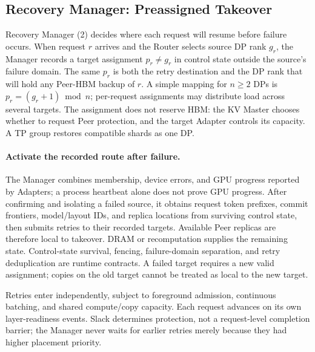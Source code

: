 \subsection{Recovery Manager: Preassigned Takeover}
\label{sec:parallel-recovery}
\label{sec:recovery-manager}

Recovery Manager (2) decides where each request will resume before
failure occurs. When request $r$ arrives and the Router selects source
DP rank $g_r$, the Manager records a target assignment $p_r\ne g_r$
in control state outside the source's failure domain. The same $p_r$
is both the retry destination and the DP rank that will hold any
Peer-HBM backup of $r$. A simple mapping for $n\ge2$ DPs is
$p_r=(g_r+1)\bmod n$; per-request assignments may distribute load across
several targets. The assignment does not reserve HBM: the KV Master
chooses whether to request Peer protection, and the target Adapter
controls its capacity. A TP group restores compatible shards as one DP.

\paragraph{Activate the recorded route after failure.}
The Manager combines membership, device errors, and GPU progress
reported by Adapters; a process heartbeat alone does not prove GPU
progress. After confirming and isolating a failed source, it obtains
request token prefixes, commit frontiers, model/layout IDs, and replica
locations from surviving control state, then submits retries to their
recorded targets. Available Peer replicas are therefore local to takeover.
DRAM or recomputation supplies the remaining state. Control-state
survival, fencing, failure-domain separation, and retry deduplication
are runtime contracts. A failed target requires a new valid assignment;
copies on the old target cannot be treated as local to the new target.

Retries enter independently, subject to foreground admission, continuous
batching, and shared compute/copy capacity. Each request advances on its
own layer-readiness events. Slack determines protection, not a request-level
completion barrier; the Manager never waits for earlier retries merely
because they had higher placement priority.

